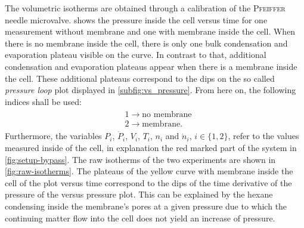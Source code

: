 \documentclass[../thesis.tex]{subfiles}
\begin{document}
      The volumetric isotherms are obtained through a calibration of the \textsc{Pfeiffer} needle microvalve.  shows the pressure inside the cell versus time for one measurement without membrane and one with membrane inside the cell. When there is no membrane inside the cell, there is only one bulk condensation and evaporation plateau visible on the curve. In contrast to that, additional condensation and evaporation plateaus appear when there is a membrane inside the cell. These additional plateaus correspond to the dips on the so called \textit{pressure loop} plot displayed in \cref{subfig:vs_pressure}. From here on, the following indices shall be used:
      \begin{align*}
          \begin{split}
              &1 \longrightarrow \textrm{no membrane} \\
              &2 \longrightarrow \textrm{membrane}.
              \label{eq:index_assignments}
          \end{split}
      \end{align*}
      Furthermore, the variables $P_i$, $\dot{P}_i$, $V_i$, $T_i$, $n_i$ and $\dot{n}_i$, $i\in \{1,2\}$, refer to the values measured inside of the cell, in explanation the red marked part of the system in \cref{fig:setup-bypass}. The raw isotherms of the two experiments are shown in \cref{fig:raw-isotherms}. The plateaus of the yellow curve with membrane inside the cell of the plot versus time  correspond to the dips of the time derivative of the pressure of the versus pressure plot. This can be explained by the hexane condensing inside the membrane's pores at a given pressure due to which the continuing matter flow into the cell does not yield an increase of pressure.
      \medskip

      
\end{document}
